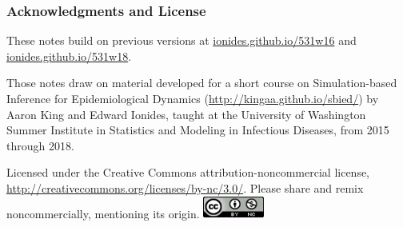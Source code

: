\documentclass{beamer}\usepackage[]{graphicx}\usepackage[]{color}
\begin{document}
\begin{frame}[fragile]
\frametitle{Acknowledgments and License}

\bi
\item These notes build on previous versions at \url{ionides.github.io/531w16} and \url{ionides.github.io/531w18}. 
\item Those notes draw on material developed for a short course on Simulation-based Inference for Epidemiological Dynamics (\url{http://kingaa.github.io/sbied/}) by Aaron King and Edward Ionides, taught at the University of Washington Summer Institute in Statistics and Modeling in Infectious Diseases, from 2015 through 2018.
\item
Licensed under the Creative Commons attribution-noncommercial license, \url{http://creativecommons.org/licenses/by-nc/3.0/}.
Please share and remix noncommercially, mentioning its origin.  
\includegraphics[width=2cm]{cc-by-nc.png}
\ei

\end{frame}


%
\end{document}
